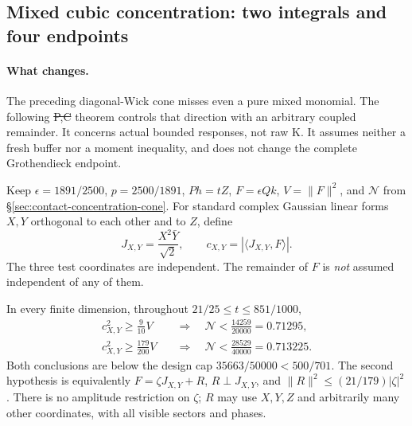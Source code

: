 \subsection{Mixed cubic concentration: two integrals and four endpoints}
\label{sec:mixed-contact-concentration}

\paragraph{What changes.}
The preceding diagonal-Wick cone misses even a pure mixed monomial.
The following \st{P,C} theorem controls that direction with an arbitrary
coupled remainder. It concerns actual bounded responses, not raw K.
It assumes neither a fresh buffer nor a moment inequality, and does not
change the complete Grothendieck endpoint.

Keep $\epsilon=1891/2500$, $p=2500/1891$, $Ph=tZ$, $F=\epsilon Qk$,
$V=\|F\|^2$, and $\mathcal N$ from
\S\ref{sec:contact-concentration-cone}. For standard complex Gaussian
linear forms $X,Y$ orthogonal to each other and to $Z$, define
\[
 J_{X,Y}=\frac{X^2\bar Y}{\sqrt2},\qquad
 c_{X,Y}=|\langle J_{X,Y},F\rangle|.
\]
The three test coordinates are independent. The remainder of $F$ is
\emph{not} assumed independent of any of them.

\begin{theorem}
\label{thm:mixed-contact-concentration}
In every finite dimension, throughout $21/25\le t\le851/1000$,
\[
 \boxed{\begin{aligned}
 c_{X,Y}^2\ge\frac9{10}V
   &\quad\Longrightarrow\quad \mathcal N<\frac{14259}{20000}=0.71295,\\
 c_{X,Y}^2\ge\frac{179}{200}V
   &\quad\Longrightarrow\quad \mathcal N<\frac{28529}{40000}=0.713225.
 \end{aligned}}
\]
Both conclusions are below the design cap $35663/50000<500/701$.
The second hypothesis is equivalently
$F=\zeta J_{X,Y}+R$, $R\perp J_{X,Y}$, and
$\|R\|^2\le(21/179)|\zeta|^2$.
There is no amplitude restriction on $\zeta$; $R$ may use $X,Y,Z$ and
arbitrarily many other coordinates, with all visible sectors and phases.
\end{theorem}

